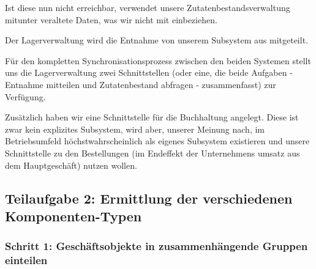 Ist diese nun nicht erreichbar, verwendet unsere Zutatenbestandsverwaltung
mitunter veraltete Daten, was wir nicht mit einbeziehen.

Der Lagerverwaltung wird die Entnahme von unserem Subsystem aus mitgeteilt.

F\"ur den kompletten Synchronisationsprozess zwischen den beiden Systemen
stellt uns die Lagerverwaltung zwei Schnittstellen (oder eine, die beide
Aufgaben - Entnahme mitteilen und Zutatenbestand abfragen - zusammenfasst)
zur Verf\"ugung.

Zus\"atzlich haben wir eine Schnittstelle f\"ur die Buchhaltung angelegt.
Diese ist zwar kein explizites Subsystem, wird aber, unserer Meinung nach,
im Betriebsumfeld h\"ochstwahrscheinlich als eigenes Subsystem existieren
und unsere Schnittstelle zu den Bestellungen (im Endeffekt der Unternehmens\-
umsatz aus dem Hauptgesch\"aft) nutzen wollen.



\subsection{Teilaufgabe 2: Ermittlung der verschiedenen Komponenten-Typen}

\subsubsection{Schritt 1: Gesch\"aftsobjekte in zusammenh\"angende Gruppen einteilen}
\label{gos}

